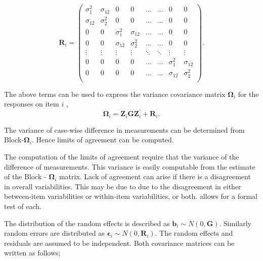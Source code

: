 \documentclass[12pt, a4paper]{report}
\theoremstyle{plain}
\theoremstyle{definition}
\theoremstyle{remark}
\begin{document}
\[ \boldsymbol{R}_i =\left(
\begin{array}{cccccccc}
\sigma^2_1  & \sigma_{12} & 0 & 0 & \ldots & \ldots & 0 & 0 \\
\sigma_{12} & \sigma^2_2  & 0 & 0  & \ldots & \ldots & 0 & 0\\

0 & 0 &\sigma^2_1  & \sigma_{12} & \ldots & \ldots& 0 &  0 \\
0 & 0 &\sigma_{12} & \sigma^2_2  & \ldots & \ldots & 0 & 0 \\
\vdots & \vdots &\vdots & \vdots & \ddots & \ddots& \vdots & \vdots \\

0 & 0 &0 & 0 & \ldots & \ldots&\sigma^2_1  & \sigma_{12} \\
0 & 0 &0 & 0 & \ldots & \ldots &\sigma_{12} & \sigma^2_2 \\
\end{array}
\right). \]

The above terms can be used to express the  variance covariance matrix $\boldsymbol{\Omega}_i$ for the responses on item $i$ ,
\[
\boldsymbol{\Omega}_i = \boldsymbol{Z}_i \boldsymbol{G} \boldsymbol{Z}_i^{\prime} + \boldsymbol{R}_i.
\]



The variance of case-wise difference in measurements can be determined from Block-$\boldsymbol{\Omega}_{i}$. Hence limits of agreement can be computed.


The computation of the limits of agreement require that the variance of the difference of measurements. This variance is easily computable from the estimate of the ${\mbox{Block - }\boldsymbol \Omega_{i}}$ matrix. Lack of agreement can arise if there is a disagreement in overall variabilities. This may be due to due to the disagreement in either between-item
variabilities or within-item variabilities, or both. \citet{ARoy2009} allows for a formal test of each.


The distribution of the random effects is described as $\boldsymbol{b}_i \sim N(0,\boldsymbol{G})$. Similarly  random errors are distributed as $\boldsymbol{\epsilon}_i \sim N(0,\boldsymbol{R}_i)$. The random effects and residuals are assumed to be independent. Both covariance matrices can be written as follows;
\end{document}
